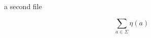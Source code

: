 \documentclass{article}
\begin{document}
a second file

\begin{equation*}
    \sum_{a\in\Sigma} \eta(a)
\end{equation*}
\end{document}
